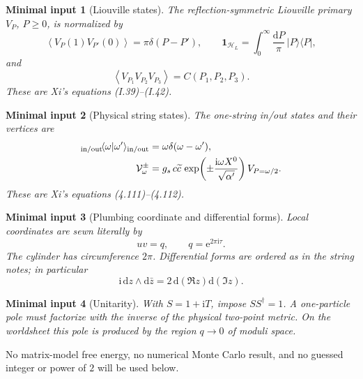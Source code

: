 \documentclass[11pt]{article}
\numberwithin{equation}{section}
\newcommand{\A}{\alpha'}
\newcommand{\dd}{\mathrm d}
\newcommand{\ee}{\mathrm e}
\newcommand{\ii}{\mathrm i}
\newcommand{\cH}{\mathcal H}
\newcommand{\cV}{\mathcal V}
\newcommand{\vev}[1]{\left\langle #1\right\rangle}
\newtheorem{minimalinput}{Minimal input}
\begin{document}
\begin{minimalinput}[Liouville states]
The reflection-symmetric Liouville primary $V_P$, $P\geq0$, is normalized by
\begin{equation}
 \vev{V_P(1)V_{P'}(0)}=\pi\delta(P-P'),
 \qquad
 \mathbf 1_{\cH_L}=\int_0^\infty\frac{\dd P}{\pi}\,
 |P\rangle\langle P|,
 \label{eq:liouville-metric}
\end{equation}
and
\begin{equation}
 \vev{V_{P_1}V_{P_2}V_{P_3}}=C(P_1,P_2,P_3).
 \label{eq:liouville-three}
\end{equation}
These are Xi's equations (I.39)--(I.42).
\end{minimalinput}

\begin{minimalinput}[Physical string states]
The one-string in/out states and their vertices are
\begin{align}
 {}_{\rm in/out}\!\langle\omega|\omega'\rangle_{\rm in/out}
 &=\omega\delta(\omega-\omega'),
 \label{eq:state-metric}\\
 \cV_\omega^\pm
 &=g_s\,c\widetilde c\,
 \exp\!\left(\pm\frac{\ii\omega X^0}{\sqrt{\A}}\right)
 V_{P=\omega/2}.
 \label{eq:physical-vertex}
\end{align}
These are Xi's equations (4.111)--(4.112).
\end{minimalinput}

\begin{minimalinput}[Plumbing coordinate and differential forms]
Local coordinates are sewn literally by
\begin{equation}
 uv=q,\qquad q=\ee^{2\pi\ii\tau}.
 \label{eq:plumbing}
\end{equation}
The cylinder has circumference $2\pi$.  Differential forms are ordered as in
the string notes; in particular
\begin{equation}
 \ii\,\dd z\wedge\dd\bar z=2\,\dd(\Re z)\dd(\Im z).
 \label{eq:complex-real}
\end{equation}
\end{minimalinput}

\begin{minimalinput}[Unitarity]
With $S=1+\ii T$, impose $SS^\dagger=1$.  A one-particle pole must factorize
with the inverse of the physical two-point metric.  On the worldsheet this pole
is produced by the region $q\to0$ of moduli space.
\end{minimalinput}

No matrix-model free energy, no numerical Monte Carlo result, and no guessed
integer or power of $2$ will be used below.
\end{document}

